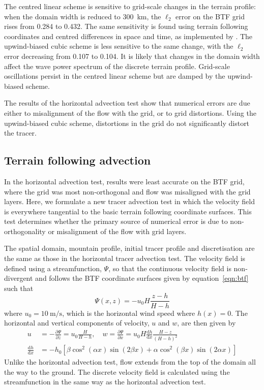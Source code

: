 \documentclass{ametsoc}
\begin{document}
The centred linear scheme is sensitive to grid-scale changes in the terrain profile: when the domain width is reduced to \SI{300}{\kilo\meter}, the $\ell_2$ error on the BTF grid rises from \num{0.284} to \num{0.432}.  The same sensitivity is found using terrain following coordinates and centred differences in space and time, as implemented by \citet{schaer2002}.  The upwind-biased cubic scheme is less sensitive to the same change, with the $\ell_2$ error decreasing from \num{0.107} to \num{0.104}.  It is likely that changes in the domain width affect the wave power spectrum of the discrete terrain profile.  Grid-scale oscillations persist in the centred linear scheme but are damped by the upwind-biased scheme.

The results of the horizontal advection test show that numerical errors are due either to misalignment of the flow with the grid, or to grid distortions.  Using the upwind-biased cubic scheme, distortions in the grid do not significantly distort the tracer.


\subsection{Terrain following advection}
In the horizontal advection test, results were least accurate on the BTF grid, where the grid was most non-orthogonal and flow was misaligned with the grid layers.  Here, we formulate a new tracer advection test in which the velocity field is everywhere tangential to the basic terrain following coordinate surfaces.  This test determines whether the primary source of numerical error is due to non-orthogonality or misalignment of the flow with grid layers. 

The spatial domain, mountain profile, initial tracer profile and discretisation are the same as those in the horizontal tracer advection test.  The velocity field is defined using a streamfunction, $\Psi$, so that the continuous velocity field is non-divergent and follows the BTF coordinate surfaces given by equation~\ref{eqn:btf} such that
\begin{equation}
	\Psi(x,z) = -u_0 H \frac{z - h}{H - h} \label{eqn:streamfunc-btf}
\end{equation}
where $u_0 = \SI{10}{\meter\per\second}$, which is the horizontal wind speed where $h(x) = 0$.
The horizontal and vertical components of velocity, $u$ and $w$, are then given by
\begin{align}
	u &= -\frac{\partial \Psi}{\partial z} = u_0 \frac{H}{H - h}, \quad w = \frac{\partial \Psi}{\partial x} = u_0 H \frac{\mathrm{d} h}{\mathrm{d} x} \frac{H - z}{\left( H - h \right)^2} \label{eqn:uw-btf} \\
	\frac{\mathrm{d} h}{\mathrm{d} x} &= - h_0 \left[ 
		\beta \cos^2 \left( \alpha x \right) \sin \left( 2 \beta x \right) +
		\alpha \cos^2 \left( \beta x \right) \sin \left( 2 \alpha x \right)
	\right]
\end{align}
Unlike the horizontal advection test, flow extends from the top of the domain all the way to the ground.  The discrete velocity field is calculated using the streamfunction in the same way as the horizontal advection test.
\end{document}
